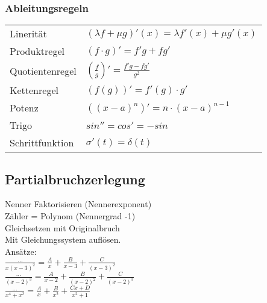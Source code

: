 \begin{minipage}{0.5\textwidth}
  \subsubsection{Ableitungsregeln}
  \begin{tabular}{ll}
    Linerität       & $(\lambda f + \mu g)'(x) = \lambda f'(x) + \mu g'(x)$ \\
    \rowcolor{TabularBackgroundColor}
    Produktregel    & $(f\cdot g)' = f'g + fg'$                             \\
    Quotientenregel & $(\frac{f}{g})' = \frac{f'g - fg'}{g^2}$              \\
    \rowcolor{TabularBackgroundColor}
    Kettenregel     & $ (f(g))' = f'(g) \cdot g' $                          \\
    Potenz          & $((x-a)^n)'= n\cdot(x-a)^{n-1}$                       \\
    \rowcolor{TabularBackgroundColor}
    Trigo           & $sin'' = cos' = -sin$                                 \\
    Schrittfunktion & $\sigma'(t) = \delta(t)$
  \end{tabular}
\end{minipage}%
\begin{minipage}{0.5\textwidth}
  \subsection{Partialbruchzerlegung}
  Nenner Faktorisieren (Nennerexponent)
  \\Zähler = Polynom (Nennergrad -1)
  \\Gleichsetzen mit Originalbruch
  \\Mit Gleichungssystem auflösen.
  \\Ansätze:
  \\ $\frac{\dots}{x(x-3)^2} = \frac{A}{x} + \frac{B}{x-3} + \frac{C}{(x-3)^2}$
  \\ $\frac{\dots}{(x-2)^3} = \frac{A}{x-2} + \frac{B}{(x-2)^2} + \frac{C}{(x-2)^3}$
  \\ $\frac{\dots}{x^4 + x^2} = \frac{A}{x} + \frac{B}{x^2} + \frac{Cx + D}{x^2 + 1}$
\end{minipage}